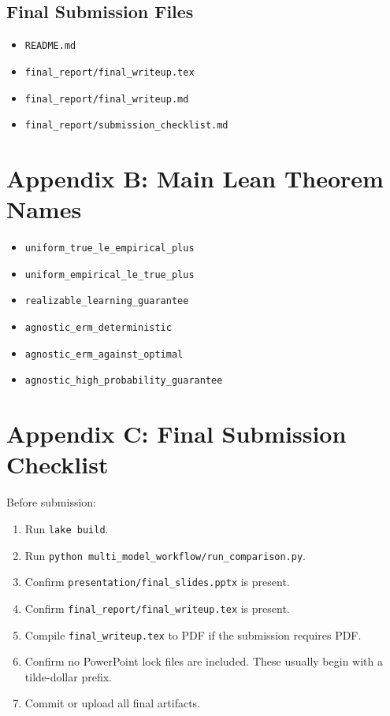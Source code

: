 \documentclass[11pt]{article}
\theoremstyle{definition}
\begin{document}
\subsection{Final Submission Files}

\begin{itemize}[leftmargin=*]
  \item \texttt{README.md}
  \item \texttt{final\_report/final\_writeup.tex}
  \item \texttt{final\_report/final\_writeup.md}
  \item \texttt{final\_report/submission\_checklist.md}
\end{itemize}

\section{Appendix B: Main Lean Theorem Names}

\begin{itemize}[leftmargin=*]
  \item \texttt{uniform\_true\_le\_empirical\_plus}
  \item \texttt{uniform\_empirical\_le\_true\_plus}
  \item \texttt{realizable\_learning\_guarantee}
  \item \texttt{agnostic\_erm\_deterministic}
  \item \texttt{agnostic\_erm\_against\_optimal}
  \item \texttt{agnostic\_high\_probability\_guarantee}
\end{itemize}

\section{Appendix C: Final Submission Checklist}

Before submission:

\begin{enumerate}[leftmargin=*]
  \item Run \texttt{lake build}.
  \item Run \texttt{python multi\_model\_workflow/run\_comparison.py}.
  \item Confirm \texttt{presentation/final\_slides.pptx} is present.
  \item Confirm \texttt{final\_report/final\_writeup.tex} is present.
  \item Compile \texttt{final\_writeup.tex} to PDF if the submission requires PDF.
  \item Confirm no PowerPoint lock files are included. These usually begin with a tilde-dollar prefix.
  \item Commit or upload all final artifacts.
\end{enumerate}
\end{document}
